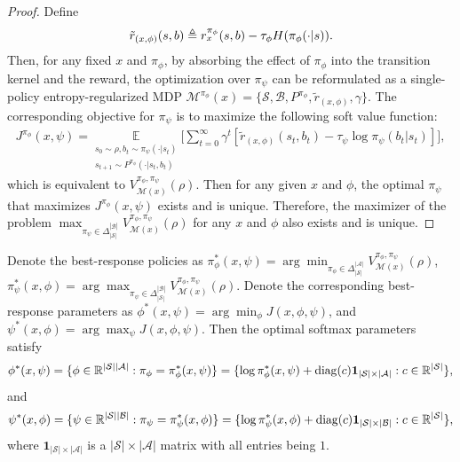 \documentclass{article}
\theoremstyle{plain}
\theoremstyle{definition}
\theoremstyle{remark}
\def\R{\mathbb R}
\def\cA{\mathcal A}
\def\cB{\mathcal B}
\def\cM{\mathcal M}
\def\cS{\mathcal S}
\def\bydef{\triangleq}
\DeclareMathOperator{\diag}{diag}
\begin{document}
\begin{proof}
    Define 
    \begin{align}
        \tilde{r}_{(x,\phi)}(s,b) \bydef r^{\pi_\phi}_x(s,b) - \tau_\phi H(\pi_\phi(\cdot|s)). \notag
    \end{align}
    Then, for any fixed $x$ and $\pi_\phi$, by absorbing the effect of
$\pi_\phi$ into the transition kernel and the reward, the optimization over
$\pi_\psi$ can be reformulated as a single-policy entropy-regularized MDP $\mathcal{M}^{\pi_\phi}(x)
=
\{\mathcal{S}, \mathcal{B}, P^{\pi_\phi},
\tilde{r}_{(x,\phi)}, \gamma\}$. The corresponding objective for $\pi_\psi$ is to maximize the following soft value function:
\begin{align}
        J^{\pi_\phi}(x,\psi) = \underset{\substack{s_0 \sim \rho, b_t \sim \pi_\psi(\cdot|s_t) \\s_{t+1} \sim P^{\pi_\phi}(\cdot|s_t,b_t)}}{\mathbb{E}} \bigg[
            \sum_{t=0}^{\infty} \gamma^t \left[
                \tilde{r}_{(x,\phi)}(s_t,b_t) - \tau_\psi \log \pi_\psi(b_t|s_t)
            \right]   
        \bigg] ,
\end{align}
    which is equivalent to $V^{\pi_\phi,\pi_\psi}_{\cM(x)}(\rho)$.
    Then for any given $x$ and $\phi$, the optimal $\pi_\psi$ that maximizes $J^{\pi_\phi}(x,\psi)$ exists and is unique. Therefore, the maximizer of the problem $\max_{\pi_\psi \in \Delta_{|\cS|}^{|\cB|}} V_{\cM(x)}^{\pi_\phi,\pi_\psi}(\rho)$ for any $x$ and $\phi$ also exists and is unique.
\end{proof}

Denote the best-response policies as $\pi^*_\phi(x,\psi) = \arg\min_{\pi_\phi \in \Delta_{|\cS|}^{|\cA|}} V_{\cM(x)}^{\pi_\phi,\pi_\psi}(\rho)$, $\pi^*_\psi(x,\phi) = \arg\max_{\pi_\psi \in \Delta_{|\cS|}^{|\cB|}} V_{\cM(x)}^{\pi_\phi,\pi_\psi}(\rho)$. Denote the corresponding best-response parameters as
$\phi^*(x,\psi) = \arg\min_\phi J(x,\phi,\psi)$,
and $\psi^*(x,\phi) = \arg\max_\psi J(x,\phi,\psi)$. 
Then the optimal softmax parameters satisfy
\begin{align}
    \phi^*(x,\psi) = \{\phi \in \R^{|\cS||\cA|} : \pi_\phi = \pi^*_\phi(x,\psi) \} = \{\log \pi_\phi^*(x,\psi) + \diag(c) \mathbf{1}_{|\cS|\times|\cA|}: c\in \R^{|\cS|} \}, \notag
\end{align}
and 
\begin{align}
    \psi^*(x,\phi) = \{\psi \in \R^{|\cS||\cB|} : \pi_\psi = \pi^*_\psi(x,\phi) \} = \{\log \pi_\psi^*(x,\phi) + \diag(c) \mathbf{1}_{|\cS|\times|\cB|}: c\in \R^{|\cS|} \}, \notag
\end{align}
where $\mathbf{1}_{|\cS|\times|\cA|}$ is a $|\cS| \times |\cA|$ matrix with all entries being $1$.
\end{document}
